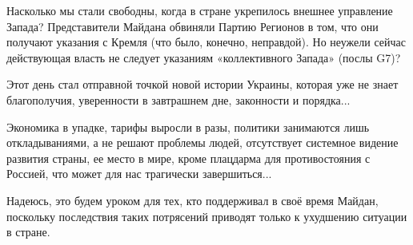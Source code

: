 Насколько мы стали свободны, когда в стране укрепилось внешнее управление
Запада? Представители Майдана обвиняли Партию Регионов в том, что они получают
указания с Кремля (что было, конечно, неправдой). Но неужели сейчас действующая
власть не следует указаниям «коллективного Запада» (послы G7)?

Этот день стал отправной точкой новой истории Украины, которая уже не знает
благополучия, уверенности в завтрашнем дне, законности и порядка...

Экономика в упадке, тарифы выросли в разы, политики занимаются лишь
откладываниями, а не решают проблемы людей, отсутствует системное видение
развития страны, ее место в мире, кроме плацдарма для противостояния с Россией,
что может для нас трагически завершиться...

Надеюсь, это будем уроком для тех, кто поддерживал в своё время Майдан,
поскольку последствия таких потрясений приводят только к ухудшению ситуации в
стране.

